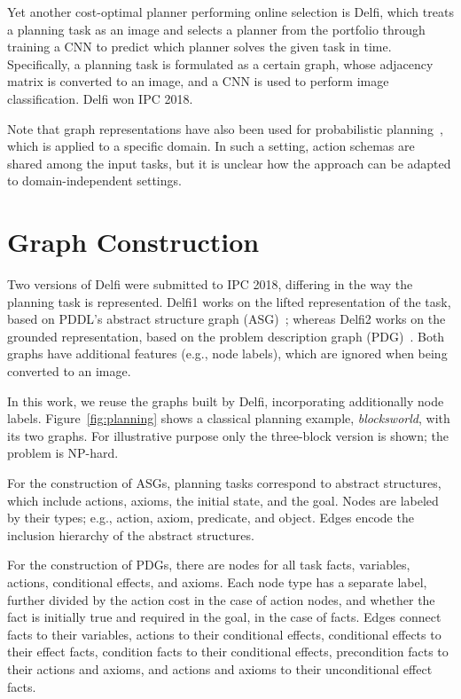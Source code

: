 \documentclass[letterpaper]{article} %
\newcommand{\pddl}{\textsc{PDDL}}
\begin{document}
Yet another cost-optimal planner performing online selection is Delfi,
which treats a planning task as an image and selects a planner from
the portfolio through training a CNN to predict which planner solves
the given task in time. Specifically, a planning task is formulated as
a certain graph, whose adjacency matrix is converted to an image, and
a CNN is used to perform image classification. Delfi won IPC 2018.

Note that graph representations have also been used for probabilistic
planning~\cite{toyer-et-al-aaai2018}, which is applied to a specific
domain. In such a setting, action schemas are shared among the input
tasks, but it is unclear how the approach can be adapted to
domain-independent settings.


\section{Graph Construction}
Two versions of Delfi were submitted to IPC 2018, differing in the way
the planning task is represented. Delfi1 works on the lifted
representation of the task, based on \pddl's abstract structure graph
(ASG)~\cite{sievers-et-al-icaps2019}; whereas Delfi2 works on
the grounded representation, based on the problem description graph
(PDG)~\cite{pochter-et-al-aaai2011}.  Both graphs have additional
features (e.g., node labels), which are ignored when being converted
to an image.

In this work, we reuse the graphs built by Delfi, incorporating
additionally node labels. Figure~\ref{fig:planning} shows a classical
planning example, {\em blocksworld}, with its two graphs. For
illustrative purpose only the three-block version is shown; the
problem is NP-hard.

For the construction of ASGs, planning tasks correspond to abstract
structures, which include actions, axioms, the initial state, and the
goal. Nodes are labeled by their types; e.g., action, axiom,
predicate, and object. Edges encode the inclusion hierarchy of the
abstract structures.

For the construction of PDGs, there are nodes for all task facts,
variables, actions, conditional effects, and axioms. Each node type
has a separate label, further divided by the action cost in the case
of action nodes, and whether the fact is initially true and required
in the goal, in the case of facts. Edges connect facts to their
variables, actions to their conditional effects, conditional effects
to their effect facts, condition facts to their conditional effects,
precondition facts to their actions and axioms, and actions and axioms
to their unconditional effect facts.
\end{document}
